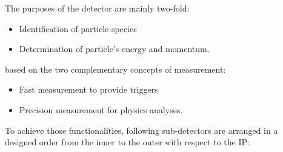 \noindent The purposes of the detector are mainly two-fold:
\begin{itemize}
\item Identification of particle species
\item Determination of particle's energy and momentum.
\end{itemize}
based on the two complementary concepts of measurement:
\begin{itemize}
\item Fast measurement to provide triggers
\item Precision measurement for physics analyses.
\end{itemize} 
To achieve those functionalities, following sub-detectors are arranged in a designed order from the inner to the outer with respect to the IP:

